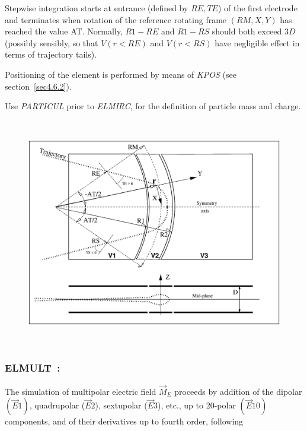 \noindent Stepwise integration starts at entrance (defined by $R\!E, T\!E$) of the first electrode 
and terminates when rotation of the reference  rotating frame  $(RM,X,Y)$ has reached the value AT. 
Normally, $R1-R\!E$ and $R1-R\!S$ should both  exceed  $3D$ (possibly sensibly, 
so that $V(r<R\!E)$ and $V(r<R\!S)$  have negligible effect in terms of trajectory tails).  

Positioning of the element is performed by means of \textsl{KPOS} (see section~\ref{sec4.6.2}). 

\bigskip

\noindent Use \textsl{PARTICUL} prior to \textsl{ELMIRC}, for the
 definition of particle mass and charge.

\vfill

\begin{figure}[H]
\centerline{\includegraphics[height=10cm]{FigELMIRC.eps}}
\caption{\label{figELMIRC} \CapELMIRC}
\end{figure}

\vfill


\newpage

\subsubsection*{ELMULT~: \ELMULTTitl} \label{ELMULT}
\medskip

The simulation of multipolar electric  field $ \vec  M_E $ proceeds by addition of 
the dipolar $ (\vec  E1) $,  quadrupolar ($ \vec  E2 $), sextupolar ($ \vec  E3 $), 
etc.,  up to 20-polar $ (\vec  E10) $ components, and of their derivatives up to fourth 
order, following

